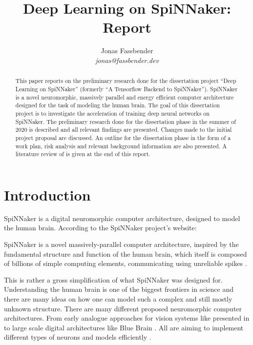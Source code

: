 \documentclass{article}
\begin{document}

\title{Deep Learning on SpiNNaker: Report}
\author{Jonas Fassbender \\ \textit{jonas@fassbender.dev}}
\date{}

\makeEPCCtitle

\newpage

\hspace{0pt}
\vfill

\begin{abstract}
This paper reports on the preliminary research done for the
dissertation project ``Deep Learning on SpiNNaker''
(formerly ``A Tensorflow Backend to SpiNNaker'').
SpiNNaker is a novel neuromorphic, massively parallel and
energy efficient computer architecture designed for the
task of modeling the human brain.
The goal of this dissertation project is to investigate the
acceleration of training deep neural networks on SpiNNaker.
The preliminary research done for the dissertation phase
in the summer of 2020 is described and all relevant
findings are presented.
Changes made to the initial project proposal are discussed.
An outline for the dissertation phase in the form of a work plan,
risk analysis and relevant background information are also presented.
A literature review of \citet{nita_2018} is given at the
end of this report.
\end{abstract}

\vfill
\hspace{0pt}

\newpage

\tableofcontents

\newpage


\section{Introduction} %
\label{sec:intro}

SpiNNaker is a digital neuromorphic computer architecture,
designed to model the human brain.
According to the SpiNNaker project's website:
\begin{displayquote}
  SpiNNaker is a novel massively-parallel computer
  architecture, inspired by the fundamental structure and
  function of the human brain, which itself is composed of
  billions of simple computing elements, communicating
  using unreliable spikes \citep{spinn_proj}.
\end{displayquote}
This is rather a gross simplification of what SpiNNaker was
designed for.
Understanding the human brain is one of the biggest
frontiers in science and there are many ideas on how one
can model such a complex and still mostly unknown structure.
There are many different proposed neuromorphic computer architectures.
From early analogue approaches for vision systems like presented in
\citet{mead1989} to large scale digital architectures like Blue Brain
\citep{markram2006}.
All are aiming to implement different types of neurons and models
efficiently \citep{furber_et_al_2007}.
\end{document}
